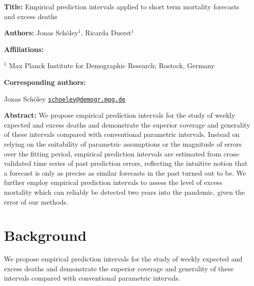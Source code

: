 \documentclass[12pt]{article}
\begin{document}
\begin{titlepage}

  {\textbf{Title:}
  Empirical prediction intervals applied to short term mortality forecasts and excess deaths
  \par\medskip}

  {\textbf{Authors:}
  Jonas Schöley$^{1}$, Ricarda Duerst$^{1}$
  \par\medskip}

  {\textbf{Affiliations:}\par
  $^1$ Max Planck Institute for Demographic Research; Rostock, Germany\par
  \par\medskip}

  {\textbf{Corresponding authors:}\par
  Jonas Schöley \href{mailto:schoeley@demogr.mpg.de}{\texttt{schoeley@demogr.mpg.de}}\par
  \par\medskip}


  {\textbf{Abstract:}
  We propose empirical prediction intervals for the study of weekly expected and excess deaths and demonstrate the superior coverage and generality of these intervals compared with conventional parametric intervals. Instead on relying on the suitability of parametric assumptions or the magnitude of errors over the fitting period, empirical prediction intervals are estimated from cross-validated time series of past prediction errors, reflecting the intuitive notion that a forecast is only as precise as similar forecasts in the past turned out to be. We further employ empirical prediction intervals to assess the level of excess mortality which can reliably be detected two years into the pandemic, given the error of our methods.
  \par\medskip}

\end{titlepage}


\section*{Background}

We propose empirical prediction intervals for the study of weekly expected and excess deaths and demonstrate the superior coverage and generality of these intervals compared with conventional parametric intervals.
\end{document}
